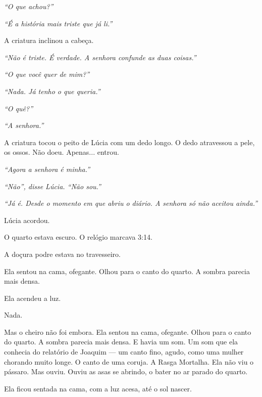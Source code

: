 \noindent \textit{\textquotedblleft{}O que achou?\textquotedblright{}}

\noindent \textit{\textquotedblleft{}É a história mais triste que já li.\textquotedblright{}}

\noindent A criatura inclinou a cabeça.

\noindent \textit{\textquotedblleft{}Não é triste. É verdade. A senhora confunde as duas coisas.\textquotedblright{}}

\noindent \textit{\textquotedblleft{}O que você quer de mim?\textquotedblright{}}

\noindent \textit{\textquotedblleft{}Nada. Já tenho o que queria.\textquotedblright{}}

\noindent \textit{\textquotedblleft{}O quê?\textquotedblright{}}

\noindent \textit{\textquotedblleft{}A senhora.\textquotedblright{}}

\noindent A criatura tocou o peito de Lúcia com um dedo longo. O dedo atravessou a pele, os ossos. Não doeu. Apenas... entrou.

\noindent \textit{\textquotedblleft{}Agora a senhora é minha.\textquotedblright{}}

\noindent \textit{\textquotedblleft{}Não\textquotedblright{}\textit{, disse Lúcia. }\textquotedblleft{}Não sou.\textquotedblright{}}

\noindent \textit{\textquotedblleft{}Já é. Desde o momento em que abriu o diário. A senhora só não aceitou ainda.\textquotedblright{}}

\noindent Lúcia acordou.

\noindent O quarto estava escuro. O relógio marcava 3:14.

\noindent A doçura podre estava no travesseiro.

\noindent Ela sentou na cama, ofegante. Olhou para o canto do quarto. A sombra parecia mais densa.

\noindent Ela acendeu a luz.

\noindent Nada.

\noindent Mas o cheiro não foi embora.
\noindent Ela sentou na cama, ofegante. Olhou para o canto do quarto. A sombra parecia mais densa. E havia um som. Um som que ela conhecia do relatório de Joaquim — um canto fino, agudo, como uma mulher chorando muito longe. O canto de uma coruja. A Rasga Mortalha. Ela não viu o pássaro. Mas ouviu. Ouviu as asas se abrindo, o bater no ar parado do quarto.

\noindent Ela ficou sentada na cama, com a luz acesa, até o sol nascer.

